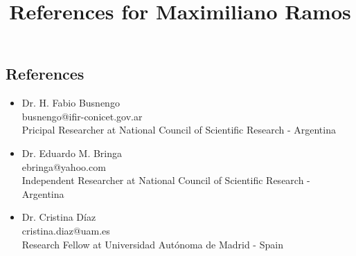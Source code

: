 \documentclass[11pt]{article}
\title{References for Maximiliano Ramos}
\date{}
\begin{document}
\maketitle

\subsection*{References}
    \begin{itemize}
        \item Dr. H. Fabio Busnengo\\
        busnengo@ifir-conicet.gov.ar \\
        Pricipal Researcher at National Council of Scientific Research - Argentina\\[12pt]
       \item Dr. Eduardo M. Bringa\\
        ebringa@yahoo.com \\
        Independent Researcher at National Council of Scientific Research - Argentina\\[12pt]
        \item Dr. Cristina Díaz\\
        cristina.diaz@uam.es\\
        Research Fellow at Universidad Autónoma de Madrid - Spain\\[12pt]
    \end{itemize}
\end{document}
